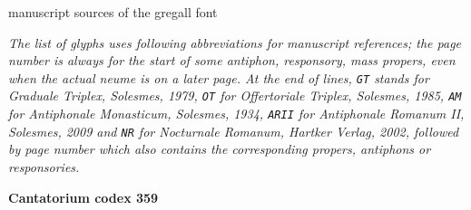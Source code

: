 \documentclass[a4paper]{article}
\begin{document}
\begin{center}
\huge{manuscript sources of the gregall font}
\end{center}

\textit{The list of glyphs uses following abbreviations for manuscript
references; the page number is always for the start of some antiphon,
responsory, mass propers, even when the actual neume is on a later page.
At the end of lines, \texttt{GT} stands for Graduale Triplex, Solesmes,
1979, \texttt{OT} for Offertoriale Triplex, Solesmes, 1985, \texttt{AM}
for Antiphonale Monasticum, Solesmes, 1934, \texttt{ARII} for Antiphonale
Romanum II, Solesmes, 2009 and \texttt{NR} for Nocturnale Romanum, Hartker
Verlag, 2002, followed by page number which also contains the corresponding
propers, antiphons or responsories.}

{\footnotesize

\begin{multicols}{2}

\noindent\textbf{Cantatorium codex 359}


\end{multicols}}
\end{document}
